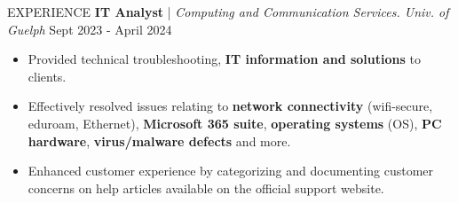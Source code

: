 \begin{rSection}{EXPERIENCE}
\quad\textbf{IT Analyst} | \textit{Computing and Communication Services. Univ. of Guelph} \hfill Sept 2023 - April 2024\\
\renewcommand\labelitemi{$\vcenter{\hbox{\tiny$\bullet$}}$}
\begin{itemize}
    \itemsep -4pt {} \vspace{-1.5em}
        \item Provided technical troubleshooting, \textbf{IT information and solutions} to clients.
        \item Effectively resolved issues relating to \textbf{network connectivity} (wifi-secure, eduroam, Ethernet), \textbf{Microsoft 365 suite}, \textbf{operating systems} (OS), \textbf{PC hardware}, \textbf{virus/malware defects} and more.
        \item Enhanced customer experience by categorizing and documenting customer concerns on help articles available on the official support website.
\end{itemize}

\end{rSection} 
